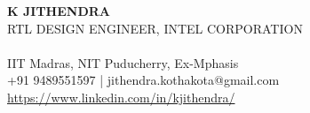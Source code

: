 \documentclass[a4paper,11pt]{article}
\begin{document}
\begin{minipage}{0.70\linewidth}
\LARGE \uppercase {\textbf{K Jithendra}}\\
\Large \uppercase{{RTL Design Engineer, Intel Corporation}}\\\\
\Large {IIT Madras, NIT Puducherry, Ex-Mphasis}\\
\Large {+91 9489551597 | jithendra.kothakota@gmail.com}\\
\Large {\href{https://www.linkedin.com/in/kjithendra/}{https://www.linkedin.com/in/kjithendra/}}\\
\end{minipage}
\begin{minipage}{0.27\linewidth}
\hfill
{}
\end{minipage}\\
\end{document}
